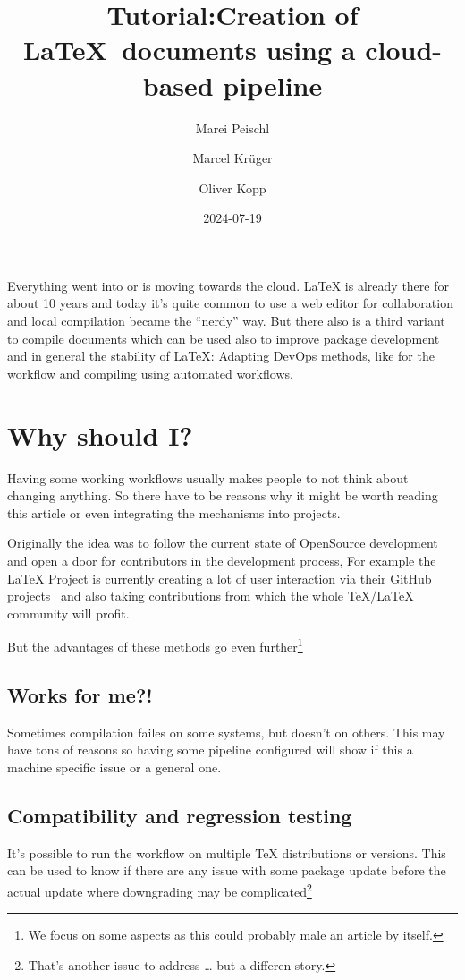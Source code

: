 \documentclass[final]{ltugboat}
\title[TUG2024: LaTeX CI/CD]{Tutorial:\newline Creation of \LaTeX\ documents using a cloud-based pipeline}
\date{2024-07-19}
\author{Marei Peischl}
\author{Marcel Krüger}
\author{Oliver Kopp}
\begin{document}
\newlength{\mintednumbersep}
%
\setlength\mintednumbersep{1em}%
\addtolength{}%

\maketitle

Everything went into or is moving towards the cloud.
\LaTeX{} is already there for about 10 years and today it's quite common to use a web editor for collaboration and local compilation became the \enquote{nerdy} way.
But there also is a third variant to compile documents which can be used also to improve package development and in general the stability of \LaTeX{}:
Adapting DevOps methods, like  for the workflow and compiling using automated workflows.

\section{Why should I?}
Having some working workflows usually makes people to not think about changing anything.
So there have to be reasons why it might be worth reading this article or even integrating the mechanisms into projects.

Originally the idea was to follow the current state of OpenSource development and open a door for contributors in the development process,
For example the \LaTeX{} Project is currently creating a lot of user interaction via their GitHub projects~\cite{latex3-github} and also taking contributions from which the whole \TeX/\LaTeX{} community will profit.

But the advantages of these methods go even further\footnote{We focus on some aspects as this could probably male an article by itself.}

\subsection{Works for me?!}
Sometimes compilation failes on some systems, but doesn't on others.
This may have tons of reasons so having some pipeline configured will show if this a machine specific issue or a general one.

\subsection{Compatibility and regression testing}
It's possible to run the workflow on multiple TeX distributions or versions.
This can be used to know if there are any issue with some package update before the actual update where downgrading may be complicated\footnote{That's another issue to address … but a differen story.}
\end{document}
